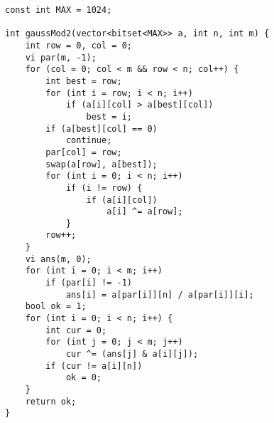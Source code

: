 \begin{verbatim}
const int MAX = 1024;

int gaussMod2(vector<bitset<MAX>> a, int n, int m) {
	int row = 0, col = 0;
	vi par(m, -1);
	for (col = 0; col < m && row < n; col++) {
		int best = row;
		for (int i = row; i < n; i++)
			if (a[i][col] > a[best][col])
				best = i;
		if (a[best][col] == 0)
			continue;
		par[col] = row;
		swap(a[row], a[best]);
		for (int i = 0; i < n; i++)
			if (i != row) {
				if (a[i][col])
					a[i] ^= a[row];
			}
		row++;
	}
	vi ans(m, 0);
	for (int i = 0; i < m; i++)
		if (par[i] != -1)
			ans[i] = a[par[i]][n] / a[par[i]][i];
	bool ok = 1;
	for (int i = 0; i < n; i++) {
		int cur = 0;
		for (int j = 0; j < m; j++)
			cur ^= (ans[j] & a[i][j]);
		if (cur != a[i][n])
			ok = 0;
	}
	return ok;
}
\end{verbatim}

